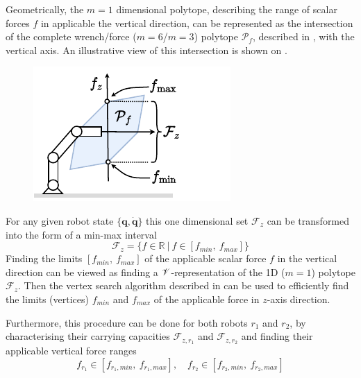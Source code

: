 Geometrically, the $m=1$ dimensional polytope, describing the range of scalar forces $f$ in applicable the vertical direction, can be represented as the intersection of the complete wrench/force ($m=6$/$m=3$) polytope $\mathcal{P}_f$, described in , with the vertical axis. An illustrative view of this intersection is shown on .

\begin{figure}
    \centering
    \includegraphics[width=\linewidth]{Papers/images/carrying_capacity_robot.pdf}
    \caption{}
    \label{fig:carrying_cap_robot}
\end{figure}

For any given robot state $\{\bm{q},\dot{\bm{q}}\}$ this one dimensional set $\mathcal{F}_z$ can be transformed into the form of a min-max interval
\begin{equation}
    \mathcal{F}_z = \{ f \in \mathbb{R} ~|~ f \in[{f}_{min}, ~{f}_{max}]\}
\end{equation}
Finding the limits $[f_{min},~f_{max}]$ of the applicable scalar force $f$ in the vertical direction can be viewed as finding a $\mathscr{V}$-representation of the 1D ($m=1$) polytope $\mathcal{F}_z$. Then the vertex search algorithm described in  can be used to efficiently find the limits (vertices) $f_{min}$ and $f_{max}$ of the applicable force in $z$-axis direction.  

Furthermore, this procedure can be done for both robots $r_1$ and $r_2$, by characterising their carrying capacities
 $\mathcal{F}_{z,r_1}$ and $\mathcal{F}_{z,r_2}$ and finding their applicable vertical force ranges 
\begin{equation}
    f_{r_1} \in [f_{r_1,min}, ~f_{r_1,max} ], \quad f_{r_2}\in [f_{r_2,min}, ~f_{r_2,max}]
    \label{eq:robot_robot_carrying_capacity}
\end{equation}
 
